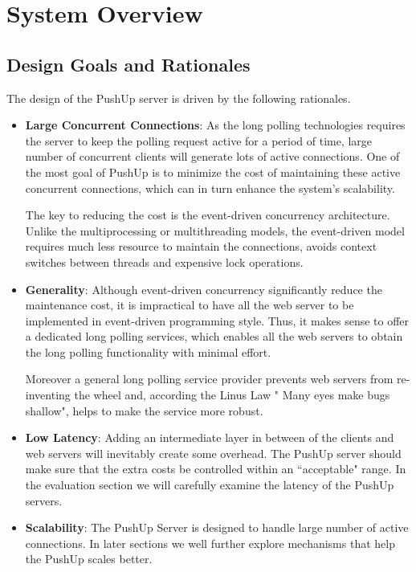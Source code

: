 \section {System Overview\\}

\subsection{Design Goals and Rationales\\}
The design of the PushUp server is driven by the following rationales.
\begin{itemize}
\item {\bf Large Concurrent Connections}:
    As the long polling technologies requires the server to keep the polling
    request active for a period of time, large number of concurrent clients 
    will generate lots of active connections. One of the most goal of PushUp
    is to minimize the cost of maintaining these active concurrent connections,
    which can in turn enhance the system's scalability.
     
    The key to reducing the cost is the event-driven concurrency architecture.
    Unlike the multiprocessing or multithreading models, the event-driven model 
    requires much less resource to maintain the connections, avoids context
    switches between threads and expensive lock operations.

\item {\bf Generality}: 
    Although event-driven concurrency significantly 
    reduce the maintenance cost, it is impractical to have all the web 
    server to be implemented in event-driven programming style. Thus, it makes
    sense to offer a dedicated long polling services, which enables all the web
    servers to obtain the long polling functionality with minimal effort.

    Moreover a general long polling service provider prevents web servers from 
    re-inventing the wheel and, according the Linus Law\cite{Linus} "
    Many eyes make bugs shallow", helps to make the service more robust.
 
\item {\bf Low Latency}: Adding an intermediate layer in between of the 
    clients and web servers will inevitably create some overhead. 
    The PushUp server should make sure that the extra costs be controlled within
    an ``acceptable" range. In the evaluation section we will carefully examine
    the latency of the PushUp servers.

\item {\bf Scalability}: The PushUp Server is designed to handle large number
    of active connections. In later sections we well further explore 
    mechanisms that help the PushUp scales better.  

\end{itemize}

